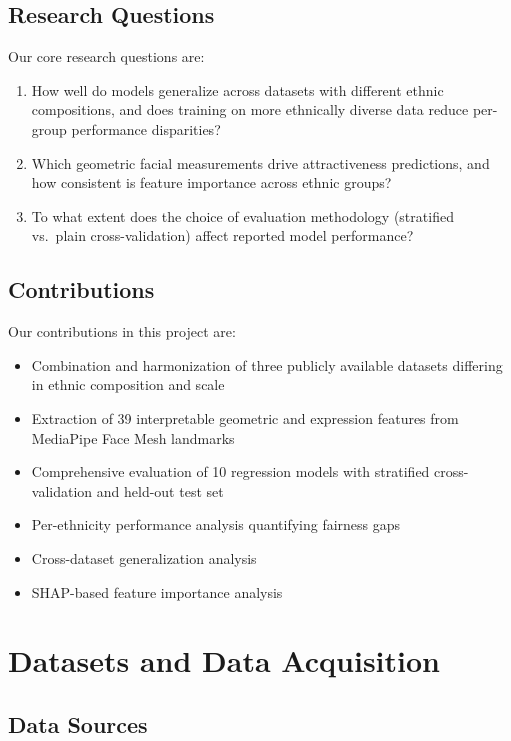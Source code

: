 \documentclass[a4paper,oneside,bibliography=totoc]{scrbook}
\begin{document}
\section{Research Questions}

Our core research questions are:

\begin{enumerate}
\item How well do models generalize across datasets with different ethnic compositions, and does training on more ethnically diverse data reduce per-group performance disparities?
\item Which geometric facial measurements drive attractiveness predictions, and how consistent is feature importance across ethnic groups?
\item To what extent does the choice of evaluation methodology (stratified vs.\ plain cross-validation) affect reported model performance?
\end{enumerate}

\section{Contributions}

Our contributions in this project are:

\begin{itemize}
\item Combination and harmonization of three publicly available datasets differing in ethnic composition and scale
\item Extraction of 39 interpretable geometric and expression features from MediaPipe Face Mesh landmarks
\item Comprehensive evaluation of 10 regression models with stratified cross-validation and held-out test set
\item Per-ethnicity performance analysis quantifying fairness gaps
\item Cross-dataset generalization analysis
\item SHAP-based feature importance analysis
\end{itemize}

\chapter{Datasets and Data Acquisition}
\label{ch:datasets}

\section{Data Sources}
\end{document}
